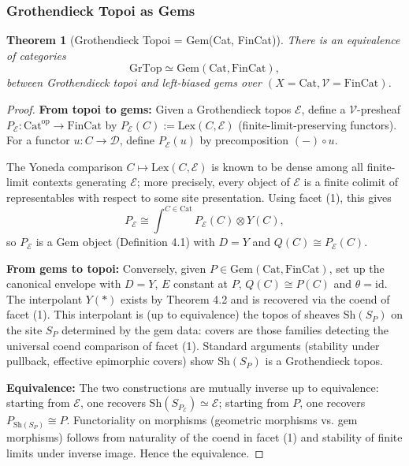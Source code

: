 \documentclass[11pt]{article}
\theoremstyle{plain}
\newtheorem{theorem}{Theorem}[section]
\theoremstyle{definition}
\theoremstyle{remark}
\newcommand{\V}{\mathcal{V}}
\newcommand{\op}{\mathrm{op}}
\newcommand{\id}{\mathrm{id}}
\begin{document}
\subsubsection{Grothendieck Topoi as Gems}

\begin{theorem}[Grothendieck Topoi = Gem(Cat, FinCat)]
There is an equivalence of categories
$$
\mathrm{GrTop} \simeq \mathrm{Gem}(\mathrm{Cat}, \mathrm{FinCat}),
$$
between Grothendieck topoi and left-biased gems over $(X = \mathrm{Cat}, \V = \mathrm{FinCat})$.
\end{theorem}

\begin{proof}
\textbf{From topoi to gems:} Given a Grothendieck topos $\mathcal{E}$, define a $\V$-presheaf $P_{\mathcal{E}} : \mathrm{Cat}^{\op} \to \mathrm{FinCat}$ by $P_{\mathcal{E}}(C) := \mathrm{Lex}(C, \mathcal{E})$ (finite-limit-preserving functors). For a functor $u : C \to \mathcal{D}$, define $P_{\mathcal{E}}(u)$ by precomposition $(-) \circ u$. 

The Yoneda comparison $C \mapsto \mathrm{Lex}(C, \mathcal{E})$ is known to be dense among all finite-limit contexts generating $\mathcal{E}$; more precisely, every object of $\mathcal{E}$ is a finite colimit of representables with respect to some site presentation. Using facet (1), this gives
$$
P_{\mathcal{E}} \cong \int^{C \in \mathrm{Cat}} P_{\mathcal{E}}(C) \otimes Y(C),
$$
so $P_{\mathcal{E}}$ is a Gem object (Definition 4.1) with $D = Y$ and $Q(C) \cong P_{\mathcal{E}}(C)$.

\textbf{From gems to topoi:} Conversely, given $P \in \mathrm{Gem}(\mathrm{Cat}, \mathrm{FinCat})$, set up the canonical envelope with $D = Y$, $E$ constant at $P$, $Q(C) \cong P(C)$ and $\theta = \id$. The interpolant $Y(\ast)$ exists by Theorem 4.2 and is recovered via the coend of facet (1). This interpolant is (up to equivalence) the topos of sheaves $\mathrm{Sh}(S_P)$ on the site $S_P$ determined by the gem data: covers are those families detecting the universal coend comparison of facet (1). Standard arguments (stability under pullback, effective epimorphic covers) show $\mathrm{Sh}(S_P)$ is a Grothendieck topos.

\textbf{Equivalence:} The two constructions are mutually inverse up to equivalence: starting from $\mathcal{E}$, one recovers $\mathrm{Sh}(S_{P_{\mathcal{E}}}) \simeq \mathcal{E}$; starting from $P$, one recovers $P_{\mathrm{Sh}(S_P)} \cong P$. Functoriality on morphisms (geometric morphisms vs. gem morphisms) follows from naturality of the coend in facet (1) and stability of finite limits under inverse image. Hence the equivalence.
\end{proof}
\end{document}
